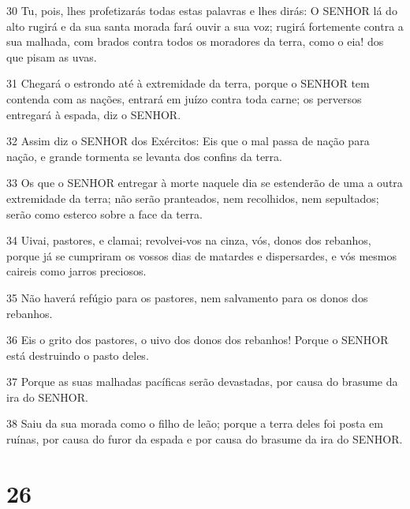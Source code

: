 \par 30 Tu, pois, lhes profetizarás todas estas palavras e lhes dirás: O SENHOR lá do alto rugirá e da sua santa morada fará ouvir a sua voz; rugirá fortemente contra a sua malhada, com brados contra todos os moradores da terra, como o eia! dos que pisam as uvas.
\par 31 Chegará o estrondo até à extremidade da terra, porque o SENHOR tem contenda com as nações, entrará em juízo contra toda carne; os perversos entregará à espada, diz o SENHOR.
\par 32 Assim diz o SENHOR dos Exércitos: Eis que o mal passa de nação para nação, e grande tormenta se levanta dos confins da terra.
\par 33 Os que o SENHOR entregar à morte naquele dia se estenderão de uma a outra extremidade da terra; não serão pranteados, nem recolhidos, nem sepultados; serão como esterco sobre a face da terra.
\par 34 Uivai, pastores, e clamai; revolvei-vos na cinza, vós, donos dos rebanhos, porque já se cumpriram os vossos dias de matardes e dispersardes, e vós mesmos caireis como jarros preciosos.
\par 35 Não haverá refúgio para os pastores, nem salvamento para os donos dos rebanhos.
\par 36 Eis o grito dos pastores, o uivo dos donos dos rebanhos! Porque o SENHOR está destruindo o pasto deles.
\par 37 Porque as suas malhadas pacíficas serão devastadas, por causa do brasume da ira do SENHOR.
\par 38 Saiu da sua morada como o filho de leão; porque a terra deles foi posta em ruínas, por causa do furor da espada e por causa do brasume da ira do SENHOR.

\chapter{26}

